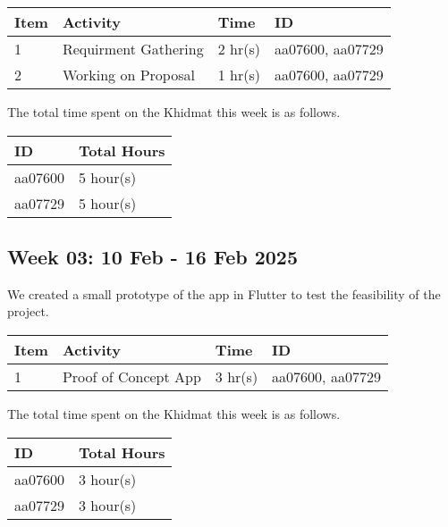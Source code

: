 \documentclass[12pt,a4paper]{article}
\begin{document}
\begin{center}
    \bigskip
    \begin{tabular}{|l|l|l|l|}
        \hline
        Item 	& Activity & Time & ID \\\hline\hline
        1	& Requirment Gathering & 2 hr(s) & aa07600, aa07729 \\\hline
        2	& Working on Proposal & 1 hr(s) & aa07600, aa07729 \\\hline
    \end{tabular}

    \bigskip
    The total time spent on the Khidmat this week is as follows.

    \bigskip
    \begin{tabular}{|l|l|}
        \hline
        ID & Total Hours\\\hline\hline
        aa07600 & 5 hour(s)\\\hline
        aa07729 & 5 hour(s)\\\hline
    \end{tabular}
\end{center}

\newpage

\subsection{Week 03: 10 Feb - 16 Feb 2025}
We created a small prototype of the app in Flutter to test the feasibility of the project.

\begin{center}
    \bigskip
    \begin{tabular}{|l|l|l|l|}
        \hline
        Item 	& Activity & Time & ID \\\hline\hline
        1	& Proof of Concept App & 3 hr(s) & aa07600, aa07729 \\\hline
    \end{tabular}

    \bigskip
    The total time spent on the Khidmat this week is as follows.

    \bigskip
    \begin{tabular}{|l|l|}
        \hline
        ID & Total Hours\\\hline\hline
        aa07600 & 3 hour(s)\\\hline
        aa07729 & 3 hour(s)\\\hline
    \end{tabular}
\end{center}
\end{document}
